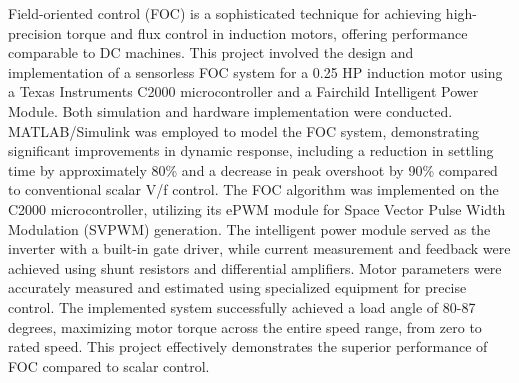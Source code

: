 
\setcounter{page}{1}



Field-oriented control (FOC) is a sophisticated technique for achieving high-precision torque and flux control in induction motors, offering performance comparable to DC machines. This project involved the design and implementation of a sensorless FOC system for a 0.25 HP induction motor using a Texas Instruments C2000 microcontroller and a Fairchild Intelligent Power Module. Both simulation and hardware implementation were conducted. MATLAB/Simulink was employed to model the FOC system, demonstrating significant improvements in dynamic response, including a reduction in settling time by approximately 80\% and a decrease in peak overshoot by 90\% compared to conventional scalar V/f control. The FOC algorithm was implemented on the C2000 microcontroller, utilizing its ePWM module for Space Vector Pulse Width Modulation (SVPWM) generation. The intelligent power module served as the inverter with a built-in gate driver, while current measurement and feedback were achieved using shunt resistors and differential amplifiers. Motor parameters were accurately measured and estimated using specialized equipment for precise control. The implemented system successfully achieved a load angle of 80-87 degrees, maximizing motor torque across the entire speed range, from zero to rated speed. This project effectively demonstrates the superior performance of FOC compared to scalar control. 


\newpage
